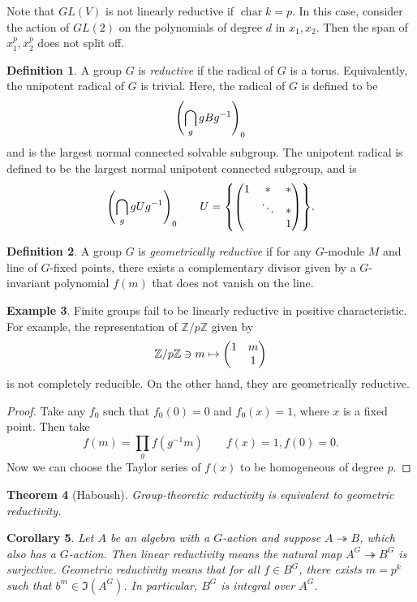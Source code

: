 \documentclass[leqno, openany]{memoir}
\newtheorem{thm}{Theorem}[section]
\newtheorem{cor}[thm]{Corollary}
\theoremstyle{definition}
\newtheorem{defn}[thm]{Definition}
\newtheorem{exm}[thm]{Example}
\theoremstyle{remark}
\theoremstyle{plain}
\theoremstyle{definition}
\theoremstyle{remark}
\newcommand{\Z}{\mathbb{Z}}
\begin{document}
Note that $GL(V)$ is not linearly reductive if $\operatorname{char} k = p$. In this case, consider the action of $GL(2)$ on the polynomials of degree $d$ in $x_1, x_2$. Then the span of $x_1^p, x_2^p$ does not split off.

\begin{defn}
    A group $G$ is \textit{reductive} if the radical of $G$ is a torus. Equivalently, the unipotent radical of $G$ is trivial. Here, the radical of $G$ is defined to be 
    \[ {\qty(\bigcap_g g B g^{-1})}_0 \]
    and is the largest normal connected solvable subgroup. The unipotent radical is defined to be the largest normal unipotent connected subgroup, and is
    \[ {\qty(\bigcap_g g U g^{-1})}_0 \qquad U = \qty{ \mqty(1 & * & * \\ & \ddots & * \\ & & 1) }. \]
\end{defn}

\begin{defn}
    A group $G$ is \textit{geometrically reductive} if for any $G$-module $M$ and line of $G$-fixed points, there exists a complementary divisor given by a $G$-invariant polynomial $f(m)$ that does not vanish on the line.
\end{defn}

\begin{exm}
    Finite groups fail to be linearly reductive in positive characteristic. For example, the representation of $\Z/p\Z$ given by 
    \[ \Z/p\Z \ni m \mapsto \mqty(1 & m \\ & 1) \]
    is not completely reducible. On the other hand, they are geometrically reductive.
\end{exm}

\begin{proof}
    Take any $f_0$ such that $f_0(0) = 0$ and $f_0(x) = 1$, where $x$ is a fixed point. Then take
    \[ f(m) = \prod_g f(g^{-1}m) \qquad f(x) = 1, f(0) = 0. \]
    Now we can choose the Taylor series of $f(x)$ to be homogeneous of degree $p$.
\end{proof}

\begin{thm}[Haboush]
    Group-theoretic reductivity is equivalent to geometric reductivity.
\end{thm}

\begin{cor}
    Let $A$ be an algebra with a $G$-action and suppose $A \twoheadrightarrow B$, which also has a $G$-action. Then linear reductivity means the natural map $A^G \twoheadrightarrow B^G$ is surjective. Geometric reductivity means that for all $f \in B^G$, there exists $m = p^k$ such that $b^m \in \Im(A^G)$. In particular, $B^G$ is integral over $A^G$.
\end{cor}
\end{document}
